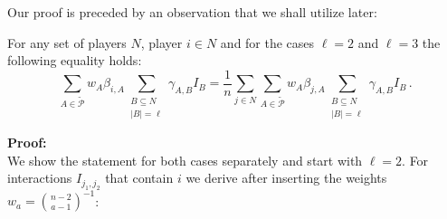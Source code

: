 Our proof is preceded by an observation that we shall utilize later:
\begin{lemma} \label{lem:sums}
    For any set of players $N$, player $i \in N$ and for the cases $\ell=2$ and $\ell=3$ the following equality holds:
    \begin{equation*}
        \sum\limits_{A \in \tilde{\mathcal{P}}} w_A \beta_{i,A} \sum\limits_{\substack{B \subseteq N \\ |B| = \ell}} \gamma_{A,B} I_B = \frac{1}{n} \sum\limits_{j \in N} \sum\limits_{A \in \tilde{\mathcal{P}}} w_A \beta_{j,A} \sum\limits_{\substack{B \subseteq N \\ |B| = \ell}} \gamma_{A,B} I_B \, .
    \end{equation*}
\end{lemma}

\textbf{Proof:} \\
We show the statement for both cases separately and start with $\ell=2$.
For interactions $I_{j_1,j_2}$ that contain $i$ we derive after inserting the weights $w_a = \binom{n-2}{a-1}^{-1}$:
